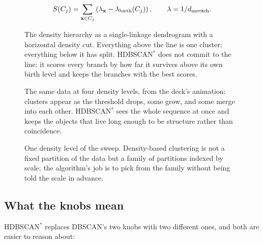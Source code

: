 \begin{equation}
S(C_j) = \sum_{\mathbf{x} \in C_j} \left( \lambda_{\mathbf{x}} -
\lambda_{\rm birth}(C_j) \right),
\qquad \lambda = 1/d_{\rm mreach} .
\label{eq:stability}
\end{equation}

\begin{figure}[htbp]\centering
  \caption{The density hierarchy as a single-linkage dendrogram with a
  horizontal density cut. Everything above the line is one cluster; everything
  below it has split. HDBSCAN$^*$ does not commit to the line: it scores every
  branch by how far it survives above its own birth level and keeps the
  branches with the best scores.}
  \label{fig:hdbscantree}
\end{figure}

\begin{figure}[htbp]\centering
  \caption{The same data at four density levels, from the deck's animation:
  clusters appear as the threshold drops, some grow, and some merge into each
  other. HDBSCAN$^*$ sees the whole sequence at once and keeps the objects that
  live long enough to be structure rather than coincidence.}
  \label{fig:hdbscanfim}
\end{figure}

\begin{figure}[htbp]\centering
  \caption{One density level of the sweep. Density-based clustering is not a
  fixed partition of the data but a family of partitions indexed by scale; the
  algorithm's job is to pick from the family without being told the scale in
  advance.}
  \label{fig:hdbscansweep}
\end{figure}

\subsection{What the knobs mean}

HDBSCAN$^*$ replaces DBSCAN's two knobs with two different ones, and both are
easier to reason about:

